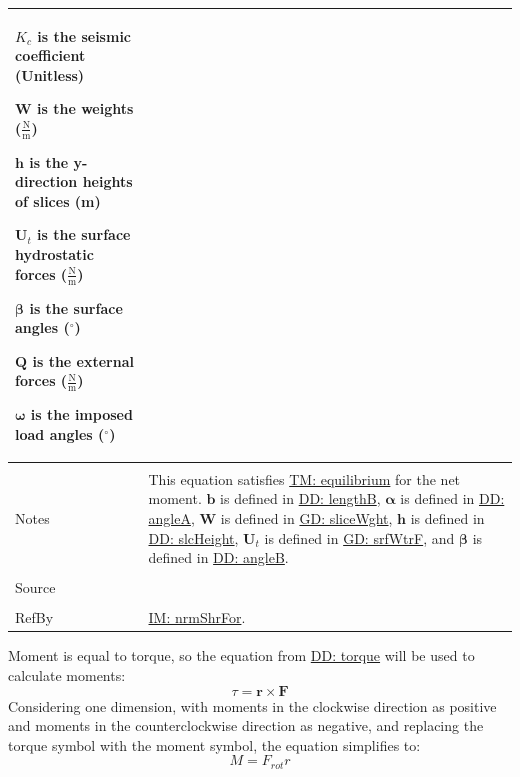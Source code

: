 \documentclass[12pt]{article}
\begin{document}
\begin{minipage}{\textwidth}
\begin{tabular}{p{} p{}}
\begin{symbDescription}
              \item{${K_{c}}$ is the seismic coefficient (Unitless)}
              \item{$\mathbf{W}$ is the weights ($\frac{\text{N}}{\text{m}}$)}
              \item{$\mathbf{h}$ is the y-direction heights of slices (m)}
              \item{${\mathbf{U}_{t}}$ is the surface hydrostatic forces ($\frac{\text{N}}{\text{m}}$)}
              \item{$\mathbf{β}$ is the surface angles (${}^{\circ}$)}
              \item{$\mathbf{Q}$ is the external forces ($\frac{\text{N}}{\text{m}}$)}
              \item{$\mathbf{ω}$ is the imposed load angles (${}^{\circ}$)}
              \end{symbDescription}
\\ \midrule \\
Notes & This equation satisfies \hyperref[TM:equilibrium]{TM: equilibrium} for the net moment. $\mathbf{b}$ is defined in \hyperref[DD:lengthB]{DD: lengthB}, $\mathbf{α}$ is defined in \hyperref[DD:angleA]{DD: angleA}, $\mathbf{W}$ is defined in \hyperref[GD:sliceWght]{GD: sliceWght}, $\mathbf{h}$ is defined in \hyperref[DD:slcHeight]{DD: slcHeight}, ${\mathbf{U}_{t}}$ is defined in \hyperref[GD:srfWtrF]{GD: srfWtrF}, and $\mathbf{β}$ is defined in \hyperref[DD:angleB]{DD: angleB}.
\\ \midrule \\
Source & \cite{chen2005}
\\ \midrule \\
RefBy & \hyperref[IM:nrmShrFor]{IM: nrmShrFor}.
\\ \bottomrule \end{tabular}
\end{minipage}
Moment is equal to torque, so the equation from \hyperref[DD:torque]{DD: torque} will be used to calculate moments:
\begin{displaymath}
τ=\mathbf{r}\times\mathbf{F}
\end{displaymath}
Considering one dimension, with moments in the clockwise direction as positive and moments in the counterclockwise direction as negative, and replacing the torque symbol with the moment symbol, the equation simplifies to:
\begin{displaymath}
M={F_{rot}} r
\end{displaymath}
\end{document}
